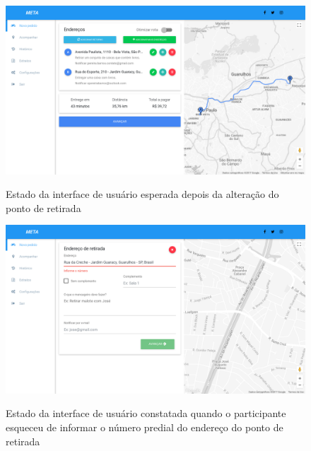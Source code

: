 \begin{apendicesenv}
		\begin{figure}[!h]
			\centering
			\caption{Estado da interface de usuário esperada depois da alteração do ponto de retirada}
			\includegraphics[width=1\textwidth]{./img/depois-alterar}
			\label{fig:depois-alterar}
		\end{figure}
		
		\begin{figure}[!h]
			\centering
			\caption{Estado da interface de usuário constatada quando o participante esqueceu de informar o número predial do endereço do ponto de retirada}
			\includegraphics[width=1\textwidth]{./img/falta-numero}
			\label{fig:falta-numero}
		\end{figure}
		
\end{apendicesenv}